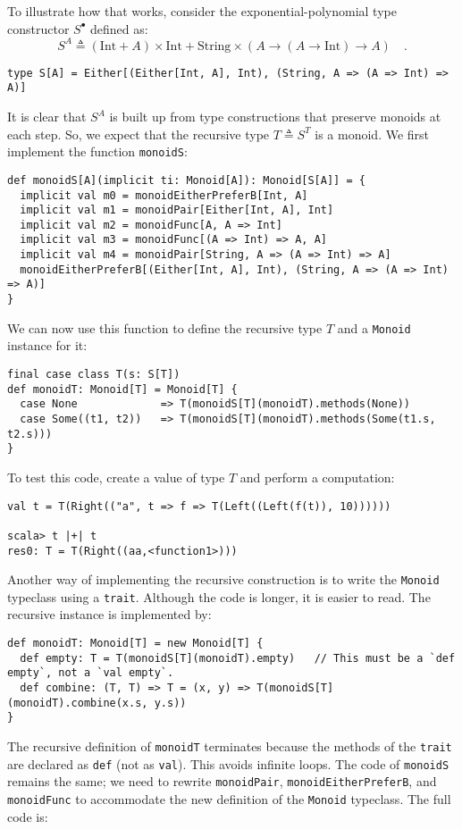 To illustrate how that works, consider the exponential-polynomial
type constructor $S^{\bullet}$ defined as:
\[
S^{A}\triangleq\left(\text{Int}+A\right)\times\text{Int}+\text{String}\times\left(A\rightarrow\left(A\rightarrow\text{Int}\right)\rightarrow A\right)\quad.
\]
\begin{lstlisting}
type S[A] = Either[(Either[Int, A], Int), (String, A => (A => Int) => A)]
\end{lstlisting}

It is clear that $S^{A}$ is built up from type constructions that
preserve monoids at each step. So, we expect that the recursive type
$T\triangleq S^{T}$ is a monoid. We first implement the function
\lstinline!monoidS!:
\begin{lstlisting}
def monoidS[A](implicit ti: Monoid[A]): Monoid[S[A]] = {
  implicit val m0 = monoidEitherPreferB[Int, A]
  implicit val m1 = monoidPair[Either[Int, A], Int]
  implicit val m2 = monoidFunc[A, A => Int]
  implicit val m3 = monoidFunc[(A => Int) => A, A]
  implicit val m4 = monoidPair[String, A => (A => Int) => A]
  monoidEitherPreferB[(Either[Int, A], Int), (String, A => (A => Int) => A)]
}
\end{lstlisting}
We can now use this function to define the recursive type $T$ and
a \lstinline!Monoid! instance for it:
\begin{lstlisting}
final case class T(s: S[T])
def monoidT: Monoid[T] = Monoid[T] {
  case None             => T(monoidS[T](monoidT).methods(None))
  case Some((t1, t2))   => T(monoidS[T](monoidT).methods(Some(t1.s, t2.s)))
}
\end{lstlisting}
To test this code, create a value of type $T$ and perform a computation:
\begin{lstlisting}
val t = T(Right(("a", t => f => T(Left((Left(f(t)), 10))))))

scala> t |+| t
res0: T = T(Right((aa,<function1>)))
\end{lstlisting}

Another way of implementing the recursive construction is to write
the \lstinline!Monoid! typeclass using a \lstinline!trait!. Although
the code is longer, it is easier to read. The recursive instance is
implemented by:
\begin{lstlisting}
def monoidT: Monoid[T] = new Monoid[T] {
  def empty: T = T(monoidS[T](monoidT).empty)   // This must be a `def empty`, not a `val empty`.
  def combine: (T, T) => T = (x, y) => T(monoidS[T](monoidT).combine(x.s, y.s))
}
\end{lstlisting}
 The recursive definition of \lstinline!monoidT! terminates because
the methods of the \lstinline!trait! are declared as \lstinline!def!
(not as \lstinline!val!). This avoids infinite loops. The code of
\lstinline!monoidS! remains the same; we need to rewrite \lstinline!monoidPair!,
\lstinline!monoidEitherPreferB!, and \lstinline!monoidFunc! to accommodate
the new definition of the \lstinline!Monoid! typeclass. The full
code is:

